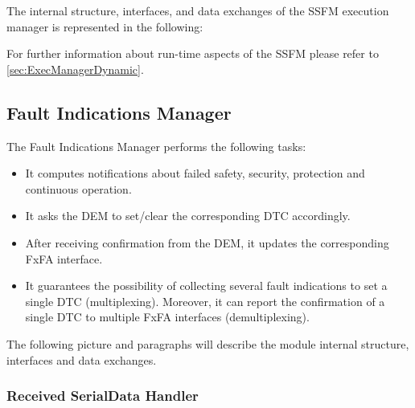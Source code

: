 The internal structure, interfaces, and data exchanges of the SSFM execution manager is represented in the following:


For further information about run-time aspects of the SSFM please refer to \ref{sec:ExecManagerDynamic}.

\subsection{Fault Indications Manager}

The Fault Indications Manager performs the following tasks:
\begin{itemize}
\item It computes notifications about failed safety, security, protection and continuous operation. 
\item It asks the DEM to set/clear the corresponding DTC accordingly. 
\item After receiving confirmation from the DEM, it updates the corresponding FxFA interface. 
\item It guarantees the possibility of collecting several fault indications to set a single DTC (multiplexing). Moreover, it can report the confirmation of a single DTC to multiple FxFA interfaces (demultiplexing).
\end{itemize}

The following picture and paragraphs will describe the module internal structure, interfaces and data exchanges.


\subsubsection{Received SerialData Handler}

